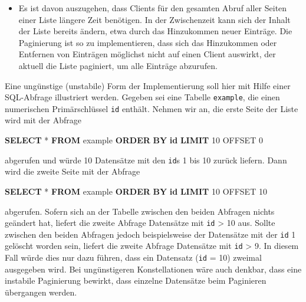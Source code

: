 \documentclass[,a4paper]{article}
\newenvironment{Shaded}{}{}
\newcommand{\KeywordTok}[1]{\textcolor[rgb]{0.00,0.44,0.13}{\textbf{{#1}}}}
\newcommand{\DecValTok}[1]{\textcolor[rgb]{0.25,0.63,0.44}{{#1}}}
\newcommand{\NormalTok}[1]{{#1}}
\begin{document}
\begin{itemize}
\itemsep1pt\parskip0pt
\item
  Es ist davon auszugehen, dass Clients für den gesamten Abruf aller
  Seiten einer Liste längere Zeit benötigen. In der Zwischenzeit kann
  sich der Inhalt der Liste bereits ändern, etwa durch das Hinzukommen
  neuer Einträge. Die Paginierung ist so zu implementieren, dass sich
  das Hinzukommen oder Entfernen von Einträgen möglichst nicht auf einen
  Client auswirkt, der aktuell die Liste paginiert, um alle Einträge
  abzurufen.
\end{itemize}

Eine ungünstige (unstabile) Form der Implementierung soll hier mit Hilfe
einer SQL-Abfrage illustriert werden. Gegeben sei eine Tabelle
\texttt{example}, die einen numerischen Primärschlüssel \texttt{id}
enthält. Nehmen wir an, die erste Seite der Liste wird mit der Abfrage

\begin{Shaded}
\begin{Highlighting}[]
\KeywordTok{SELECT} \NormalTok{* }\KeywordTok{FROM} \NormalTok{example }\KeywordTok{ORDER} \KeywordTok{BY} \KeywordTok{id} \KeywordTok{LIMIT} \DecValTok{10} \NormalTok{OFFSET }\DecValTok{0}
\end{Highlighting}
\end{Shaded}

abgerufen und würde 10 Datensätze mit den \texttt{id}s 1 bis 10 zurück
liefern. Dann wird die zweite Seite mit der Abfrage

\begin{Shaded}
\begin{Highlighting}[]
\KeywordTok{SELECT} \NormalTok{* }\KeywordTok{FROM} \NormalTok{example }\KeywordTok{ORDER} \KeywordTok{BY} \KeywordTok{id} \KeywordTok{LIMIT} \DecValTok{10} \NormalTok{OFFSET }\DecValTok{10}
\end{Highlighting}
\end{Shaded}

abgerufen. Sofern sich an der Tabelle zwischen den beiden Abfragen
nichts geändert hat, liefert die zweite Abfrage Datensätze mit
\texttt{id} \textgreater{} 10 aus. Sollte zwischen den beiden Abfragen
jedoch beispielsweise der Datensätze mit der \texttt{id} 1 gelöscht
worden sein, liefert die zweite Abfrage Datensätze mit \texttt{id}
\textgreater{} 9. In diesem Fall würde dies nur dazu führen, dass ein
Datensatz (\texttt{id} = 10) zweimal ausgegeben wird. Bei ungünstigeren
Konstellationen wäre auch denkbar, dass eine instabile Paginierung
bewirkt, dass einzelne Datensätze beim Paginieren übergangen werden.
\end{document}

